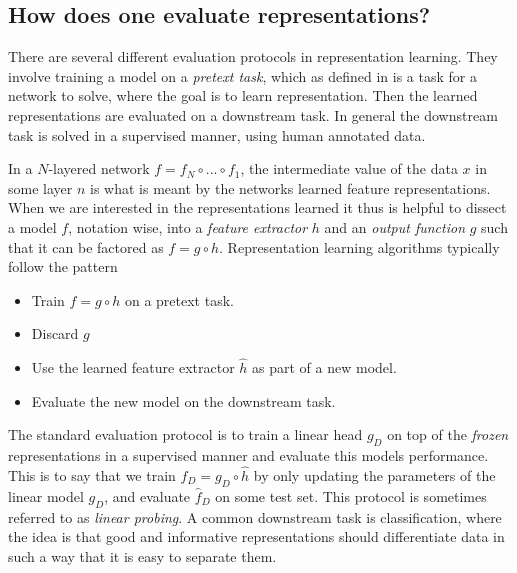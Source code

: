 \documentclass[../../thesis.tex]{subfiles}
\begin{document}
\subsection{How does one evaluate representations?}
There are several different evaluation protocols in representation learning. They involve training a model on a \textit{pretext task}, which as defined in \cite{jing2019selfsupervised} is a task for a network to solve, where the goal is to learn representation. Then the learned representations are evaluated on a downstream task. In general the downstream task is solved in a supervised manner, using human annotated data.\newline

In a $N$-layered network $f = f_N\circ ...\circ f_1$, the intermediate value of the data $x$ in some layer $n$ is what is meant by the networks learned feature representations. When we are interested in the representations learned it thus is helpful to dissect a model $f$, notation wise, into a \textit{feature extractor} $h$ and an \textit{output function} $g$ such that it can be factored as $f = g \circ h$. Representation learning algorithms typically follow the pattern
\begin{itemize}
    \item Train $f= g \circ h$ on a pretext task.
    \item Discard $g$
    \item Use the learned feature extractor $\widehat{h}$ as part of a new model.
    \item Evaluate the new model on the downstream task. 
\end{itemize}








The standard evaluation protocol is to train a linear head $g_D$ on top of the \textit{frozen} representations in a supervised manner and evaluate this models performance. This is to say that we train  $f_D = g_D\circ \widehat{h}$ by only updating the parameters of the linear model $g_D$, and evaluate $\widehat{f}_D$ on some test set. This protocol is sometimes referred to as \textit{linear probing}. A common downstream task is classification, where the idea is that good and informative representations should differentiate data in such a way that it is easy to separate them. \newline
\end{document}
